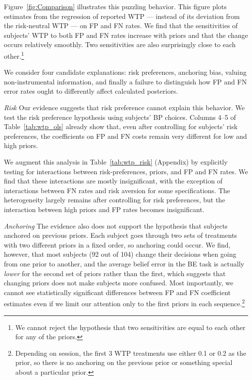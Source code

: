 \documentclass[12pt,a4paper]{article}
\begin{document}
Figure~\ref{fig:Comparison} illustrates this puzzling behavior. This figure plots estimates from the regression of reported WTP --- instead of its deviation from the risk-neutral WTP --- on FP and FN rates. We find that the sensitivities of subjects' WTP to both FP and FN rates increase with priors and that the change occurs relatively smoothly. Two sensitivities are also surprisingly close to each other.\footnote{We cannot reject the hypothesis that two sensitivities are equal to each other for any of the priors.} 

We consider four candidate explanations: risk preferences, anchoring bias, valuing non-instrumental information, and finally a failure to distinguish how FP and FN error rates ought to differently affect calculated posteriors. 

\emph{Risk} Our evidence suggests that risk preference cannot explain this behavior. We test the risk preference hypothesis using subjects' BP choices. Columns 4--5 of Table~\ref{tab:wtp_ols} already show that, even after controlling for subjects' risk preferences, the coefficients on FP and FN costs remain very different for low and high priors.

We augment this analysis in Table~\ref{tab:wtp_risk} (Appendix) by explicitly testing for interactions between risk-preferences, priors, and FP and FN rates. We find that these interactions are mostly insignificant, with the exception of interactions between FN rates and risk aversion for some specifications. The heterogeneity largely remains after controlling for risk preferences, but the interaction between high priors and FP rates becomes insignificant.

\emph{Anchoring} The evidence also does not support the hypothesis that subjects anchored on previous priors. Each subject goes through two sets of treatments with two different priors in a fixed order, so anchoring could occur.  We find, however, that most subjects (92 out of 104) change their decisions when going from one prior to another, and the average belief error in the BE task is actually \emph{lower} for the second set of priors rather than the first, which suggests that changing priors does not make subjects more confused. Most importantly, we cannot see statistically significant differences between FP and FN coefficient estimates even if we limit our attention only to the first priors in each sequence.\footnote{Depending on session, the first 3 WTP treatments use either 0.1 or 0.2 as the prior, so there is no anchoring on the previous prior or something special about a particular prior.}
\end{document}
